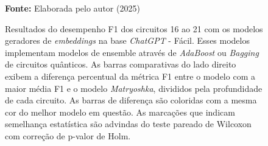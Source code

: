 \begin{figure}
\caption{Resultados do desempenho F1 dos circuitos 16 ao 21 com os modelos geradores de \textit{embeddings} na base \textit{ChatGPT} - Fácil. Esses modelos implementam modelos de ensemble através de \textit{AdaBoost} ou \textit{Bagging} de circuitos quânticos. As barras comparativas do lado direito exibem a diferença percentual da métrica F1 entre o modelo com a maior média F1 e o modelo \textit{Matryoshka}, divididos pela profundidade de cada circuito. As barras de diferença são coloridas com a mesma cor do melhor modelo em questão. As marcações que indicam semelhança estatística são advindas do teste pareado de Wilcoxon com correção de p-valor de Holm.}
\label{fig:model_transformer:easy:g6}
     \centering
    \centering

      \par\medskip\ABNTEXfontereduzida\selectfont\textbf{Fonte:} Elaborada pelo autor (2025) \par\medskip
\end{figure}